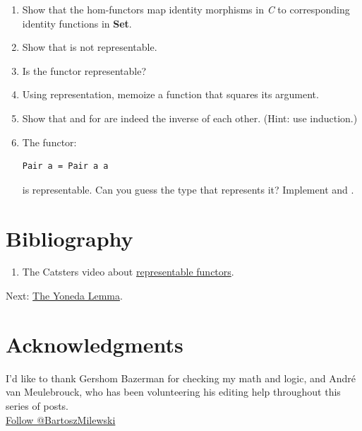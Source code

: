 \begin{enumerate}
\item
  Show that the hom-functors map identity morphisms in \emph{C} to
  corresponding identity functions in \textbf{Set}.
\item
  Show that  is not representable.
\item
  Is the  functor representable?
\item
  Using  representation, memoize a function that squares
  its argument.
\item
  Show that  and  for  are
  indeed the inverse of each other. (Hint: use induction.)
\item
  The functor:

\begin{Verbatim}[commandchars=\\\{\}]
Pair a = Pair a a
\end{Verbatim}

  is representable. Can you guess the type that represents it? Implement
   and .
\end{enumerate}

\section{Bibliography}\label{bibliography}

\begin{enumerate}
\tightlist
\item
  The Catsters video about
  \href{https://www.youtube.com/watch?v=4QgjKUzyrhM}{representable
  functors}.
\end{enumerate}

Next:
\href{https://bartoszmilewski.com/2015/09/01/the-yoneda-lemma/}{The
Yoneda Lemma}.

\section{Acknowledgments}\label{acknowledgments}

I'd like to thank Gershom Bazerman for checking my math and logic, and
André van Meulebrouck, who has been volunteering his editing help
throughout this series of posts.\\
\href{https://twitter.com/BartoszMilewski}{Follow @BartoszMilewski}
